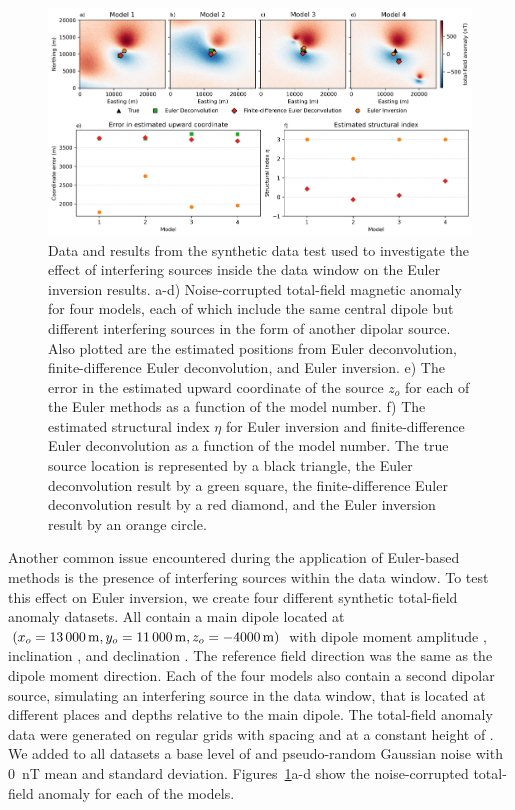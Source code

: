 \begin{figure}[tb!]
\centering
\includegraphics[width=1\linewidth]{figures/synthetic-interfering-sources.png}
\caption{
    Data and results from the synthetic data test used to investigate the effect of interfering sources inside the data window on the Euler inversion results.
    a-d) Noise-corrupted total-field magnetic anomaly for four models, each of which include the same central dipole but different interfering sources in the form of another dipolar source. Also plotted are the estimated positions from Euler deconvolution, finite-difference Euler deconvolution, and Euler inversion.
    e) The error in the estimated upward coordinate of the source $z_o$ for each of the Euler methods as a function of the model number.
    f) The estimated structural index $\eta$ for Euler inversion and finite-difference Euler deconvolution as a function of the model number.
    The true source location is represented by a black triangle, the Euler deconvolution result by a green square, the finite-difference Euler deconvolution result by a red diamond, and the Euler inversion result by an orange circle.
}
\label{fig:interf}
\end{figure}

Another common issue encountered during the application of Euler-based methods is the presence of interfering sources within the data window.
To test this effect on Euler inversion, we create four different synthetic total-field anomaly datasets.
All contain a main dipole located at $(x_o=\SynInterfTrueEast, y_o=\SynInterfTrueNorth, z_o=\SynInterfTrueUp)$ with dipole moment amplitude \SynInterfInt{}, inclination \SynInterfInc, and declination \SynInterfDec.
The reference field direction was the same as the dipole moment direction.
Each of the four models also contain a second dipolar source, simulating an interfering source in the data window, that is located at different places and depths relative to the main dipole.
The total-field anomaly data were generated on regular grids with spacing \SynInterfSpacing{} and at a constant height of \SynInterfHeight.
We added to all datasets a base level of \SynInterfTrueBase{} and pseudo-random Gaussian noise with \qty{0}{\nano\tesla} mean and \SynInterfNoise{} standard deviation.
Figures~\ref{fig:interf}a-d show the noise-corrupted total-field anomaly for each of the models.

